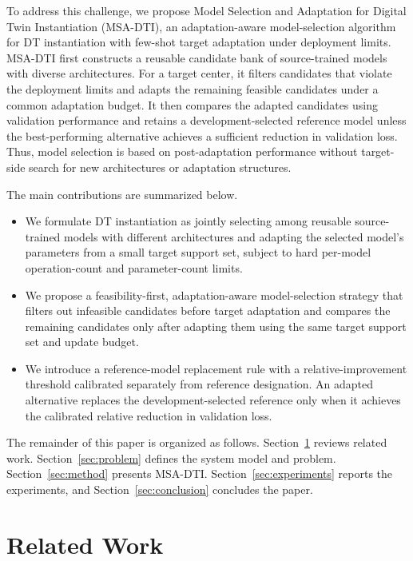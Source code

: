 \documentclass[a4paper,fleqn]{cas-sc}
\begin{document}
To address this challenge, we propose Model Selection and Adaptation for
Digital Twin Instantiation (MSA-DTI), an adaptation-aware model-selection
algorithm for DT instantiation with few-shot target adaptation under deployment
limits. MSA-DTI first
constructs a reusable candidate bank of source-trained models with diverse
architectures. For a target center, it filters candidates that violate the
deployment limits and adapts the remaining feasible candidates under a common adaptation
budget. It then compares the adapted candidates using validation performance
and retains a development-selected reference model unless the best-performing alternative
achieves a sufficient reduction in validation loss. Thus, model selection is
based on post-adaptation performance without target-side search for new architectures or
adaptation structures.

The main contributions are summarized below.

\begin{itemize}

\item We formulate DT instantiation as jointly selecting among reusable
source-trained models with different architectures and adapting the selected
model's parameters from a small target support set, subject to hard per-model
operation-count and parameter-count limits.

\item We propose a feasibility-first, adaptation-aware model-selection strategy
that filters out infeasible candidates before target adaptation and compares
the remaining candidates only after adapting them using the same target support
set and update budget.

\item We introduce a reference-model replacement rule with a relative-improvement
threshold calibrated separately from reference designation. An adapted alternative
replaces the development-selected reference only when it achieves the calibrated relative
reduction in validation loss.

\end{itemize}

The remainder of this paper is organized as follows.
Section~\ref{sec:related} reviews related work.
Section~\ref{sec:problem} defines the system model and problem.
Section~\ref{sec:method} presents MSA-DTI.
Section~\ref{sec:experiments} reports the experiments, and
Section~\ref{sec:conclusion} concludes the paper.

\section{Related Work}
\label{sec:related}
\end{document}

